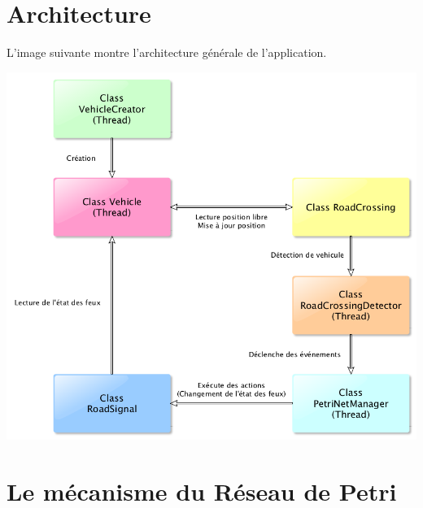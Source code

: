 \documentclass[11pt,a4paper, openany]{memoir}
\begin{document}
\chapter{Architecture}

L'image suivante montre l'architecture générale de l'application.

\includegraphics[scale=0.5]{images/architecture.png} 

\chapter{Le mécanisme du Réseau de Petri}
\end{document}
